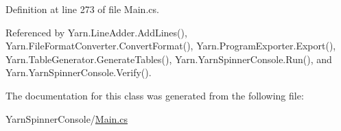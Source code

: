 Definition at line 273 of file Main.\-cs.



Referenced by Yarn.\-Line\-Adder.\-Add\-Lines(), Yarn.\-File\-Format\-Converter.\-Convert\-Format(), Yarn.\-Program\-Exporter.\-Export(), Yarn.\-Table\-Generator.\-Generate\-Tables(), Yarn.\-Yarn\-Spinner\-Console.\-Run(), and Yarn.\-Yarn\-Spinner\-Console.\-Verify().



The documentation for this class was generated from the following file\-:\begin{DoxyCompactItemize}
\item 
Yarn\-Spinner\-Console/\hyperlink{a00325}{Main.\-cs}\end{DoxyCompactItemize}
